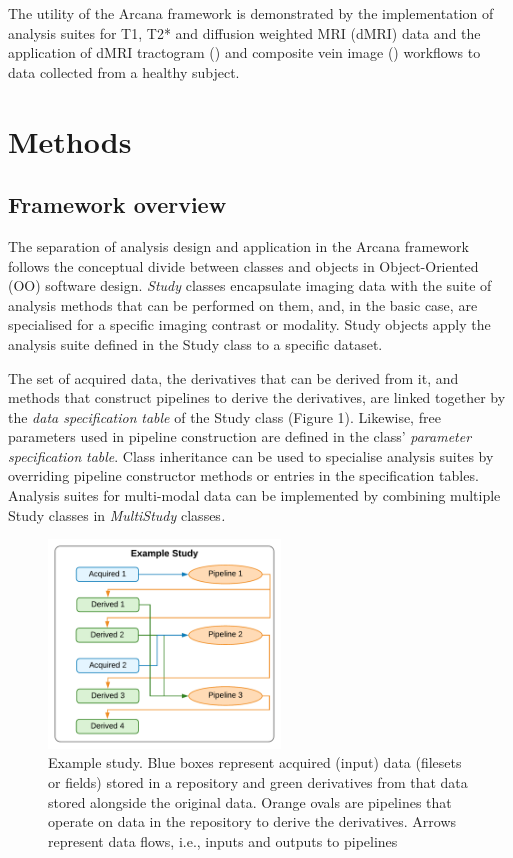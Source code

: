 The utility of the Arcana framework is demonstrated by the
implementation of analysis suites for T1, T2* and diffusion weighted MRI
(dMRI) data and the application of dMRI tractogram (\cite{tournier_mrtrix:_2012}) and
composite vein image (\cite{ward_combining_2018}) workflows to data collected from a
healthy subject.

\section{Methods}
\label{methods}

\subsection{Framework overview}
\label{framework-overview}

The separation of analysis design and application in the Arcana
framework follows the conceptual divide between classes and objects in
Object-Oriented (OO) software design. \emph{Study} classes encapsulate
imaging data with the suite of analysis methods that can be performed on
them, and, in the basic case, are specialised for a specific imaging
contrast or modality. Study objects apply the analysis suite defined in
the Study class to a specific dataset.

The set of acquired data, the derivatives that can be derived from it,
and methods that construct pipelines to derive the derivatives, are
linked together by the \emph{data specification} \emph{table} of the
Study class (Figure 1). Likewise, free parameters used in pipeline
construction are defined in the class' \emph{parameter specification}
\emph{table}. Class inheritance can be used to specialise analysis
suites by overriding pipeline constructor methods or entries in the
specification tables. Analysis suites for multi-modal data can be
implemented by combining multiple Study classes in \emph{MultiStudy}
classes\emph{.}

\begin{figure}
  \begin{center}
    \includegraphics[width=0.55\textwidth]{figures/example_study}
  \caption{Example study. Blue boxes represent acquired (input)
data (filesets or fields) stored in a repository and green derivatives
from that data stored alongside the original data. Orange ovals are
pipelines that operate on data in the repository to derive the
derivatives. Arrows represent data flows, i.e., inputs and outputs to
pipelines}
  \end{center}
\label{fig:example_study}
\end{figure}

